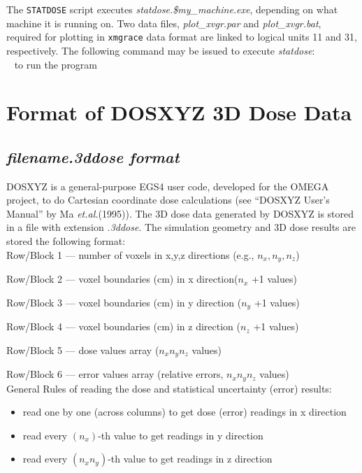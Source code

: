 \documentclass[12pt,twoside]{article}
\newcommand{\etal}{{\em et.al.}}
\begin{document}
The \verb+STATDOSE+ script executes {\em statdose.\$my\_machine.exe},
depending on what machine it is running on. Two data files, {\em
plot\_xvgr.par} and {\em plot\_xvgr.bat}, required for plotting in {\tt xmgrace}
 data format are linked to logical units 11 and 31,
respectively. The following command may be issued to execute {\em
statdose}:  \newline\\ \  to run the program
\newline\\ \section{Format of DOSXYZ 3D Dose Data  } \subsection{{\em
filename.3ddose format}} DOSXYZ is a general-purpose EGS4 user code,
developed for the OMEGA project,  to do Cartesian coordinate dose
calculations (see ``DOSXYZ User's Manual'' by Ma \etal (1995)). The 3D
dose data generated by DOSXYZ is stored in a file with extension {\em
.3ddose}. The simulation geometry and 3D dose results are stored the
following format:\\

\setlength{\parindent}{0em}
Row/Block 1 --- number of voxels in x,y,z directions (e.g., $n_x, n_y, n_z$)

Row/Block 2 --- voxel boundaries (cm) in x direction($ n_x$ +1 values)

Row/Block 3 --- voxel boundaries (cm) in y direction
($ n_y$ +1 values)

Row/Block 4 --- voxel boundaries (cm) in z direction
($ n_z$ +1 values)

Row/Block 5 --- dose values array ($ n_x  n_y  n_z$  values)

Row/Block 6 --- error values array (relative errors, $ n_x  n_y  n_z$  values)\\

General Rules of reading the dose and statistical uncertainty (error) results:

\begin{itemize}
\item read one by one (across columns) to get dose (error) readings in x direction
\item read every $(n_x)$-th value to get readings in y direction
\item read every $(n_xn_y)$-th value to get readings in z direction
\end{itemize}
\end{document}
